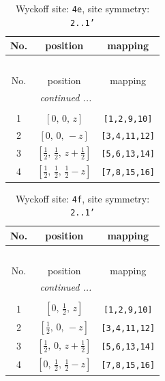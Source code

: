 \documentclass[fleqn,8pt]{jsarticle}
\begin{document}
\begin{longtable}{ccc}
\caption{Wyckoff site: {\tt 4e}, site symmetry: {\tt 2..1'}}
 \\
 \hline \hline
No. & position & mapping \\ \hline \endfirsthead

\multicolumn{2}{l}{\tablename\ \thetable{}} \\
 \hline \hline
No. & position & mapping \\ \hline \endhead

 \hline \hline
\multicolumn{2}{r}{\footnotesize\it continued ...} \\ \endfoot

 \hline \hline
\multicolumn{2}{r}{} \\ \endlastfoot

1 & $\left[ 0,\, 0,\, z \right]$ & {\tt [1,2,9,10]} \\ \hline
2 & $\left[ 0,\, 0,\, - z \right]$ & {\tt [3,4,11,12]} \\ \hline
3 & $\left[ \frac{1}{2},\, \frac{1}{2},\, z + \frac{1}{2} \right]$ & {\tt [5,6,13,14]} \\ \hline
4 & $\left[ \frac{1}{2},\, \frac{1}{2},\, \frac{1}{2} - z \right]$ & {\tt [7,8,15,16]} \\
\end{longtable}
\renewcommand{\arraystretch}{1.2}
\begin{longtable}{ccc}
\caption{Wyckoff site: {\tt 4f}, site symmetry: {\tt 2..1'}}
 \\
 \hline \hline
No. & position & mapping \\ \hline \endfirsthead

\multicolumn{2}{l}{\tablename\ \thetable{}} \\
 \hline \hline
No. & position & mapping \\ \hline \endhead

 \hline \hline
\multicolumn{2}{r}{\footnotesize\it continued ...} \\ \endfoot

 \hline \hline
\multicolumn{2}{r}{} \\ \endlastfoot

1 & $\left[ 0,\, \frac{1}{2},\, z \right]$ & {\tt [1,2,9,10]} \\ \hline
2 & $\left[ \frac{1}{2},\, 0,\, - z \right]$ & {\tt [3,4,11,12]} \\ \hline
3 & $\left[ \frac{1}{2},\, 0,\, z + \frac{1}{2} \right]$ & {\tt [5,6,13,14]} \\ \hline
4 & $\left[ 0,\, \frac{1}{2},\, \frac{1}{2} - z \right]$ & {\tt [7,8,15,16]} \\
\end{longtable}
\end{document}
